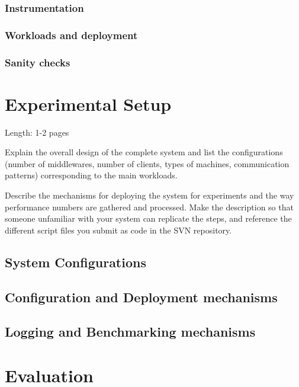 \documentclass[11pt]{article}
\begin{document}
\subsubsection{Instrumentation}\label{sec:instrumentation}

\subsubsection{Workloads and deployment}\label{sec:workloads-and-deployment}

\subsubsection{Sanity checks}\label{sec:sanity-checks}

\section{Experimental Setup}\label{sec:experimental-setup}

Length: 1-2 pages

Explain the overall design of the complete system and list the
configurations (number of middlewares, number of clients, types of
machines, communication patterns) corresponding to the main workloads.

Describe the mechanisms for deploying the system for experiments and the
way performance numbers are gathered and processed. Make the description
so that someone unfamiliar with your system can replicate the steps, and
reference the different script files you submit as code in the SVN
repository.

\subsection{System Configurations}\label{sec:system-configurations}

\subsection{Configuration and Deployment mechanisms}\label{sec:configuration-and
-deployment-mechanisms}

\subsection{Logging and Benchmarking mechanisms}\label{sec:logging-and-benchmark
ing-mechanisms}

\section{Evaluation}\label{sec:evaluation}
\end{document}
